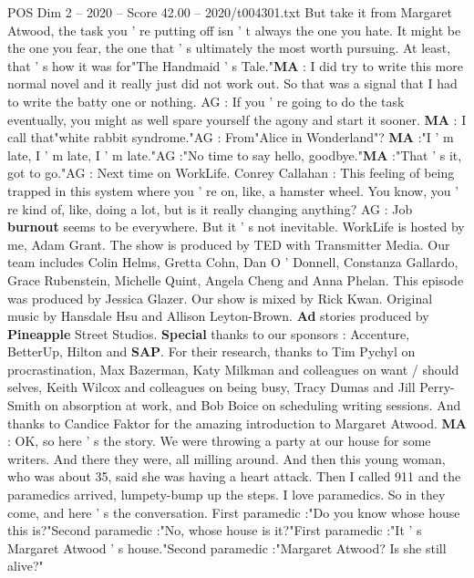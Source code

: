\begin{textsample}{POS Dim 2 – 2020 – Score 42.00 – 2020/t004301.txt}
But take it from Margaret Atwood, the task you ' re putting off isn ' t always the one you hate.
It might be the one you fear, the one that ' s ultimately the most worth pursuing.
At least, that ' s how it was for"The Handmaid ' s Tale."\textbf{MA} : I did try to write this more normal novel and it really just did not work out.
So that was a signal that I had to write the batty one or nothing.
AG : If you ' re going to do the task eventually, you might as well spare yourself the agony and start it sooner. \textbf{MA} : I call that"white rabbit syndrome."AG : From"Alice in Wonderland"? \textbf{MA} :"I ' m late, I ' m late, I ' m late."AG :"No time to say hello, goodbye."\textbf{MA} :"That ' s it, got to go."AG : Next time on WorkLife.
Conrey Callahan : This feeling of being trapped in this system where you ' re on, like, a hamster wheel.
You know, you ' re kind of, like, doing a lot, but is it really changing anything?
AG : Job \textbf{burnout} seems to be everywhere.
But it ' s not inevitable.
WorkLife is hosted by me, Adam Grant.
The show is produced by TED with Transmitter Media.
Our team includes Colin Helms, Gretta Cohn, Dan O ' Donnell, Constanza Gallardo, Grace Rubenstein, Michelle Quint, Angela Cheng and Anna Phelan.
This episode was produced by Jessica Glazer.
Our show is mixed by Rick Kwan.
Original music by Hansdale Hsu and Allison Leyton-Brown. \textbf{Ad} stories produced by \textbf{Pineapple} Street Studios. \textbf{Special} thanks to our sponsors : Accenture, BetterUp, Hilton and \textbf{SAP}.
For their research, thanks to Tim Pychyl on procrastination, Max Bazerman, Katy Milkman and colleagues on want / should selves, Keith Wilcox and colleagues on being busy, Tracy Dumas and Jill Perry-Smith on absorption at work, and Bob Boice on scheduling writing sessions.
And thanks to Candice Faktor for the amazing introduction to Margaret Atwood. \textbf{MA} : OK, so here ' s the story.
We were throwing a party at our house for some writers.
And there they were, all milling around.
And then this young woman, who was about 35, said she was having a heart attack.
Then I called 911 and the paramedics arrived, lumpety-bump up the steps.
I love paramedics.
So in they come, and here ' s the conversation.
First paramedic :"Do you know whose house this is?"Second paramedic :"No, whose house is it?"First paramedic :"It ' s Margaret Atwood ' s house."Second paramedic :"Margaret Atwood?
Is she still alive?"

\end{textsample}
